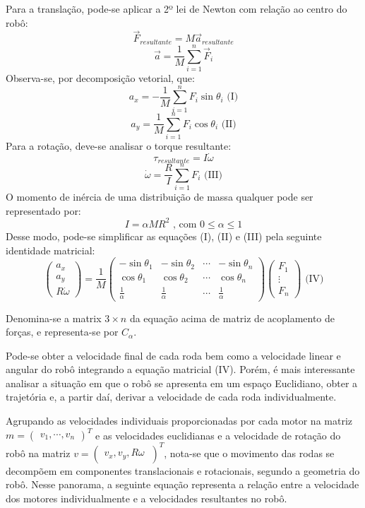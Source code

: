 \documentclass{article}
\begin{document}
Para a translação, pode-se aplicar a 2º lei de Newton com relação ao centro do robô:
\[\vec{F}_{resultante} = M\vec{a}_{resultante}\]
\[\vec{a}=\frac{1}{M}\sum_{i=1}^{n}\vec{F}_i\]
\hspace{1cm}Observa-se, por decomposição vetorial, que:
\[a_x=-\frac{1}{M}\sum_{i=1}^{n}F_i\sin\theta_i \text{ (I)}  \]     
\[a_y=\frac{1}{M}\sum_{i=1}^{n}F_i\cos\theta_i \text{ (II)}\]	
\hspace{1cm}Para a rotação, deve-se analisar o torque resultante:
\[\tau_{resultante}=I\dot{\omega}\]
\[\dot{\omega}=\frac{R}{I}\sum_{i=1}^{n}F_i \text{ (III)}\]
\hspace{1cm}O momento de inércia de uma distribuição de massa qualquer pode ser representado por:
\[I=\alpha MR^2\text{ , com } 0\leq\alpha\leq1\]
\hspace{1cm}Desse modo, pode-se simplificar as equações (I), (II) e (III) pela seguinte identidade matricial:
\[
\begin{pmatrix}a_{x}\\a_{y}\\R\dot{\omega} \end{pmatrix}
=\frac{1}{M}
\begin{pmatrix}
  -\sin\theta_1 & -\sin\theta_2 & \cdots & -\sin\theta_n \\
  \cos\theta_1 & \cos\theta_2 & \cdots & \cos\theta_n \\
  \frac{1}{\alpha} & \frac{1}{\alpha} &\cdots & \frac{1}{\alpha}
 \end{pmatrix}
\begin{pmatrix}F_{1}\\ \vdots \\ F_{n} \end{pmatrix} \text{ (IV)}
\]

Denomina-se a matrix $3 \times n$ da equação acima de matriz de acoplamento de forças, e representa-se por \( C_\alpha \). 

Pode-se obter a velocidade final de cada roda bem como a velocidade linear e angular do robô integrando a equação matricial (IV). Porém, é mais interessante analisar a situação em que o robô se apresenta em um espaço Euclidiano, obter a trajetória e, a partir daí, derivar a velocidade de cada roda individualmente.

Agrupando as velocidades individuais proporcionadas por cada motor na matriz $m=\begin{pmatrix}v_{1},\cdots,v_{n} \end{pmatrix}^T$ e as velocidades euclidianas e a velocidade de rotação do robô na matriz  $v=\begin{pmatrix}v_{x},v_{y},R{\omega}\ \end{pmatrix}^T$, nota-se que o movimento das rodas se decompõem em componentes translacionais e rotacionais, segundo a geometria do robô. Nesse panorama, a seguinte equação representa a relação entre a velocidade dos motores individualmente e a velocidades resultantes no robô.
\end{document}
